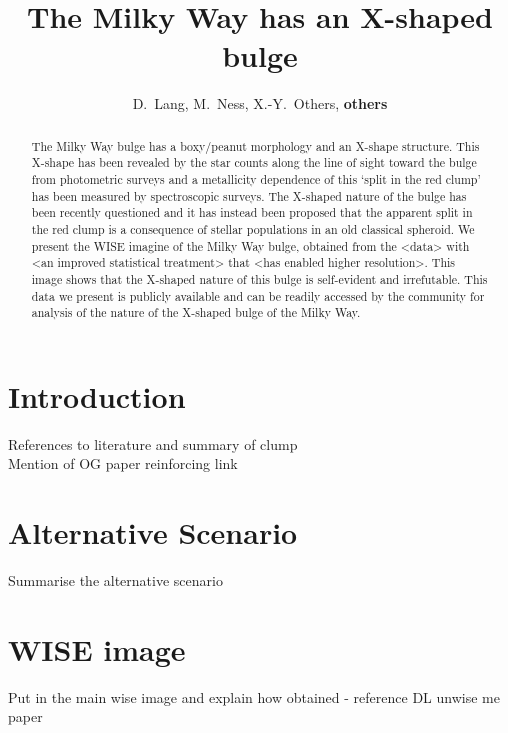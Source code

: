 \documentclass[12pt, preprint]{aastex}
\begin{document}
\title{The Milky Way has an X-shaped bulge} 
\author{D.~Lang,
M.~Ness,
X.-Y.~Others,
\textbf{others}}

\begin{abstract}%
The Milky Way bulge has a boxy/peanut morphology and an X-shape structure. This X-shape has been revealed by the 
star counts along the line of sight toward the bulge from photometric surveys and a metallicity dependence of this 
`split in the red clump' has been measured by spectroscopic surveys. The X-shaped nature of the bulge has been recently questioned and it has instead been proposed that the apparent split in the red clump is a consequence of stellar populations in an old classical spheroid. We present the WISE imagine of the Milky Way bulge, obtained from the <data> with <an improved statistical treatment> that <has enabled higher resolution>. This image shows that the X-shaped nature of this bulge is self-evident and irrefutable. This data we present is publicly available and can be readily accessed by the community for analysis of the nature of the X-shaped bulge of the Milky Way. 
\end{abstract}


\keywords{%
}

\section{Introduction}\label{sec:Intro}

References to literature and summary of clump \\
Mention of OG paper reinforcing link \\

\section{Alternative Scenario} 

Summarise the alternative scenario \\

\section{WISE image} 

Put in the main wise image and explain how obtained - reference DL unwise me paper \\
\end{document}
